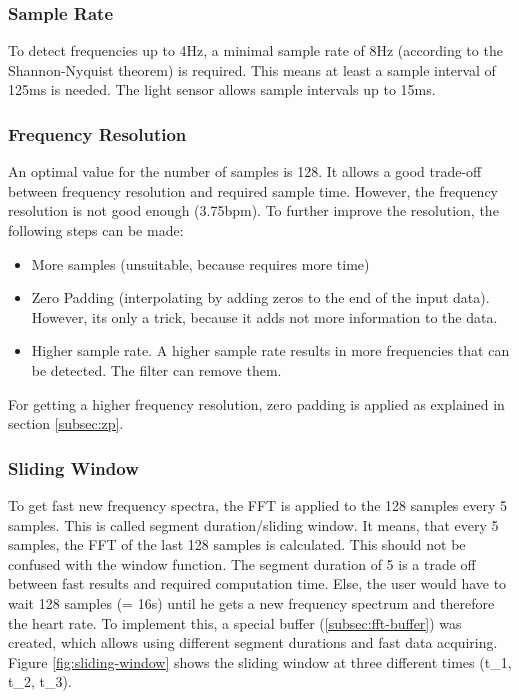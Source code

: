 \documentclass[notitlepage]{scrreprt}
\begin{document}
\subsubsection{Sample Rate}
To detect frequencies up to 4Hz, a minimal sample rate of 8Hz (according to the Shannon-Nyquist theorem) is required. This means at least a sample interval of 125ms is needed. The light sensor allows sample intervals up to 15ms.

\subsubsection{Frequency Resolution}
An optimal value for the number of samples is 128. It allows a good trade-off between frequency resolution and required sample time. However, the frequency resolution is not good enough (3.75bpm). To further improve the resolution, the following steps can be made:

\begin{itemize}
	\item{More samples (unsuitable, because requires more time)}
	\item{Zero Padding (interpolating by adding zeros to the end of the input data). However, its only a trick, because it adds not more information to the data.}
	\item{Higher sample rate. A higher sample rate results in more frequencies that can be detected. The filter can remove them.}
\end{itemize}

For getting a higher frequency resolution, zero padding is applied as explained in section \ref{subsec:zp}.

\subsubsection{Sliding Window}
\label{subsubsec:sliding-window}
To get fast new frequency spectra, the FFT is applied to the 128 samples every 5 samples. This is called segment duration/sliding window. It means, that every 5 samples, the FFT of the last 128 samples is calculated. This should not be confused with the window function. The segment duration of 5 is a trade off between fast results and required computation time. Else, the user would have to wait 128 samples (= 16s) until he gets a new frequency spectrum and therefore the heart rate. To implement this, a special buffer (\ref{subsec:fft-buffer}) was created, which allows using different segment durations and fast data acquiring. Figure \ref{fig:sliding-window} shows the sliding window at three different times (t\_1, t\_2, t\_3).
\end{document}

